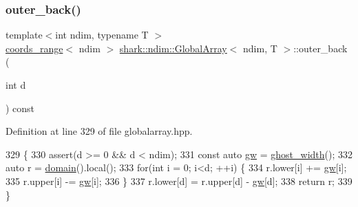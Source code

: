 \subsubsection{\texorpdfstring{outer\+\_\+back()}{outer\_back()}}
{\footnotesize\ttfamily template$<$int ndim, typename T $>$ \\
\hyperlink{structshark_1_1ndim_1_1coords__range}{coords\+\_\+range}$<$ ndim $>$ \hyperlink{classshark_1_1ndim_1_1_global_array}{shark\+::ndim\+::\+Global\+Array}$<$ ndim, T $>$\+::outer\+\_\+back (\begin{DoxyParamCaption}\item[{int}]{d }\end{DoxyParamCaption}) const\hspace{0.3cm}{\ttfamily [inline]}}



Definition at line 329 of file globalarray.\+hpp.


\begin{DoxyCode}
329                                                                              \{
330                         assert(d >= 0 && d < ndim);
331                         \textcolor{keyword}{const} \textcolor{keyword}{auto} \hyperlink{classshark_1_1ndim_1_1_global_array_a38d93d114d585e5e5491c5ecd35c6bfc}{gw} = \hyperlink{classshark_1_1ndim_1_1_global_array_a5331f21887f3c14791b758e99656a676}{ghost\_width}();
332                         \textcolor{keyword}{auto} r = \hyperlink{classshark_1_1ndim_1_1_global_array_a435ee8ff23c3feadf2ef2be64d4f375c}{domain}().local();
333                         \textcolor{keywordflow}{for}(\textcolor{keywordtype}{int} i = 0; i<d; ++i) \{
334                             r.lower[i] += \hyperlink{classshark_1_1ndim_1_1_global_array_a38d93d114d585e5e5491c5ecd35c6bfc}{gw}[i];
335                             r.upper[i] -= \hyperlink{classshark_1_1ndim_1_1_global_array_a38d93d114d585e5e5491c5ecd35c6bfc}{gw}[i];
336                         \}
337                         r.lower[d] = r.upper[d] - \hyperlink{classshark_1_1ndim_1_1_global_array_a38d93d114d585e5e5491c5ecd35c6bfc}{gw}[d];
338                         \textcolor{keywordflow}{return} r;
339         \}
\end{DoxyCode}
\hypertarget{classshark_1_1ndim_1_1_global_array_a991cfff5cda18b938bc52cfc1c383680}{}\label{classshark_1_1ndim_1_1_global_array_a991cfff5cda18b938bc52cfc1c383680} 

